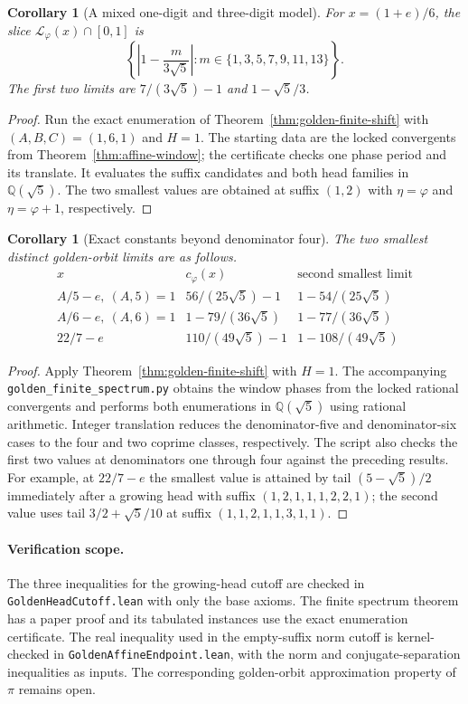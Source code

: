 \documentclass[11pt]{amsart}
\newtheorem{corollary}[theorem]{Corollary}
\theoremstyle{definition}
\theoremstyle{remark}
\numberwithin{equation}{section}
\newcommand{\Q}{\mathbb{Q}}
\begin{document}
\begin{corollary}[A mixed one-digit and three-digit model]\label{cor:golden-mixed}
For $x=(1+e)/6$, the slice $\mathcal L_\varphi(x)\cap[0,1]$ is
\[
 \left\{\left|1-\frac{m}{3\sqrt5}\right|:
          m\in\{1,3,5,7,9,11,13\}\right\}.
\]
The first two limits are $7/(3\sqrt5)-1$ and $1-\sqrt5/3$.
\end{corollary}
\begin{proof}
Run the exact enumeration of Theorem~\ref{thm:golden-finite-shift}
with $(A,B,C)=(1,6,1)$ and $H=1$. The starting data are the
locked convergents from Theorem~\ref{thm:affine-window}; the
certificate checks one phase period and its translate. It evaluates
the suffix candidates and both head families in $\Q(\sqrt5)$.
The two smallest values are obtained at suffix $(1,2)$ with
$\eta=\varphi$ and $\eta=\varphi+1$, respectively.
\end{proof}

\begin{corollary}[Exact constants beyond denominator four]
\label{cor:golden-finite-shift-examples}
The two smallest distinct golden-orbit limits are as follows.
\[
\begin{array}{c|cc}
x & c_\varphi(x) & \text{second smallest limit}\\ \hline
A/5-e,\ (A,5)=1 & 56/(25\sqrt5)-1 & 1-54/(25\sqrt5)\\
A/6-e,\ (A,6)=1 & 1-79/(36\sqrt5) & 1-77/(36\sqrt5)\\
22/7-e & 110/(49\sqrt5)-1 & 1-108/(49\sqrt5)
\end{array}
\]
\end{corollary}

\begin{proof}
Apply Theorem~\ref{thm:golden-finite-shift} with $H=1$. The accompanying
\texttt{golden\_finite\_spectrum.py} obtains the window phases from the
locked rational convergents and performs both enumerations in
$\Q(\sqrt5)$ using rational arithmetic. Integer translation reduces
the denominator-five and denominator-six cases to the four and two
coprime classes, respectively. The script also checks the first two
values at denominators one through four against the preceding results.
For example, at $22/7-e$ the smallest value is attained by tail
$(5-\sqrt5)/2$ immediately after a growing head with suffix
$(1,2,1,1,1,2,2,1)$; the second value uses tail
$3/2+\sqrt5/10$ at suffix $(1,1,2,1,1,3,1,1)$.
\end{proof}

\paragraph{Verification scope.}
The three inequalities for the growing-head cutoff are checked in
\texttt{GoldenHeadCutoff.lean} with only the base axioms. The finite
spectrum theorem has a paper proof and its tabulated instances use the
exact enumeration certificate. The real inequality used in the empty-suffix
norm cutoff is kernel-checked in \texttt{GoldenAffineEndpoint.lean}, with
the norm and conjugate-separation inequalities as inputs.
The corresponding golden-orbit
approximation property of $\pi$ remains open.
\end{document}
